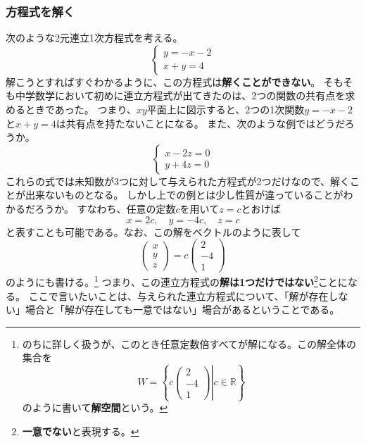 \documentclass[10pt]{jsreport}
\theoremstyle{definition}%
\newcommand{\nkakko}[1]{\left\{ #1 \right\}} %
\numberwithin{equation}{section}%
\begin{document}
\subsubsection{方程式を解く}
次のような2元連立1次方程式を考える。
\begin{equation}
  \label{tokenai1}
  \begin{cases}
    y=-x-2\\
    x+y=4
  \end{cases}
\end{equation}
解こうとすればすぐわかるように、この方程式は{\bf 解くことができない}。
そもそも中学数学において初めに連立方程式が出てきたのは、2つの関数の共有点を求めるときであった。
つまり、$xy$平面上に図示すると、2つの1次関数$y=-x-2$と$x+y=4$は共有点を持たないことになる。
また、次のような例ではどうだろうか。
\begin{equation}
\label{tokenai2}  \begin{cases}
    x-2z=0\\
    y+4z=0
  \end{cases}
\end{equation}
これらの式では未知数が3つに対して与えられた方程式が2つだけなので、解くことが出来ないものとなる。
しかし上での例とは少し性質が違っていることがわかるだろうか。
すなわち、任意の定数$c$を用いて$z=c$とおけば
\begin{equation}
  x=2c,\quad y=-4c, \quad z=c
\end{equation}
と表すことも可能である。なお、この解をベクトルのように表して
\begin{equation}
  \begin{pmatrix}
    x\\
    y\\
    z
  \end{pmatrix}=c\begin{pmatrix}
    2\\
    -4\\
    1
  \end{pmatrix}
\end{equation}
のようにも書ける。\footnote{のちに詳しく扱うが、このとき任意定数倍すべてが解になる。この解全体の集合を\begin{equation}
  W=\nkakko{\left. c\begin{pmatrix}
    2\\
    -4\\
    1
  \end{pmatrix} \right| c \in \mathbb{R}}
\end{equation}のように書いて{\bf 解空間}という。}
つまり、この連立方程式の{\bf 解は1つだけではない}\footnote{{\bf 一意でない}と表現する。}ことになる。
ここで言いたいことは、与えられた連立方程式について、「解が存在しない」場合と「解が存在しても一意ではない」場合があるということである。
\end{document}
